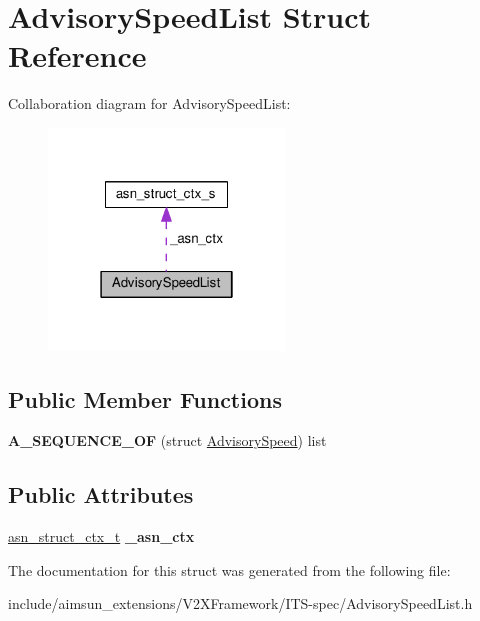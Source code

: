 \hypertarget{structAdvisorySpeedList}{}\section{Advisory\+Speed\+List Struct Reference}
\label{structAdvisorySpeedList}


Collaboration diagram for Advisory\+Speed\+List\+:\nopagebreak
\begin{figure}[H]
\begin{center}
\leavevmode
\includegraphics[width=178pt]{structAdvisorySpeedList__coll__graph}
\end{center}
\end{figure}
\subsection*{Public Member Functions}
\begin{DoxyCompactItemize}
\item 
{\bfseries A\+\_\+\+S\+E\+Q\+U\+E\+N\+C\+E\+\_\+\+OF} (struct \hyperlink{structAdvisorySpeed}{Advisory\+Speed}) list\hypertarget{structAdvisorySpeedList_ab8899d68bec7f62a6d62017a8e5d2cd3}{}\label{structAdvisorySpeedList_ab8899d68bec7f62a6d62017a8e5d2cd3}

\end{DoxyCompactItemize}
\subsection*{Public Attributes}
\begin{DoxyCompactItemize}
\item 
\hyperlink{structasn__struct__ctx__s}{asn\+\_\+struct\+\_\+ctx\+\_\+t} {\bfseries \+\_\+asn\+\_\+ctx}\hypertarget{structAdvisorySpeedList_af7e3a9c19d4a99f2ec2115fec19f10f7}{}\label{structAdvisorySpeedList_af7e3a9c19d4a99f2ec2115fec19f10f7}

\end{DoxyCompactItemize}


The documentation for this struct was generated from the following file\+:\begin{DoxyCompactItemize}
\item 
include/aimsun\+\_\+extensions/\+V2\+X\+Framework/\+I\+T\+S-\/spec/Advisory\+Speed\+List.\+h\end{DoxyCompactItemize}
